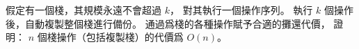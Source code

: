 \startEXERCISE
假定有一個棧，其規模永遠不會超過 $k$，
對其執行一個操作序列。
執行 $k$ 個操作後，自動複製整個棧進行備份。
通過爲棧的各種操作賦予合適的攤還代價，
證明： $n$ 個棧操作（包括複製棧）的代價爲 $O(n)$。
\stopEXERCISE

\startANSWER
{}
\stopANSWER
